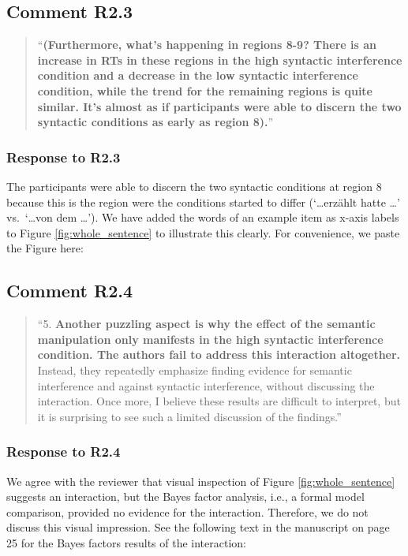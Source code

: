 \documentclass[12pt]{article}
\begin{document}
\subsection*{Comment R2.3}
\begin{quote}
``\textbf{(Furthermore, what's happening in regions 8-9? There is an increase in RTs in these regions in the high syntactic interference condition and a decrease in the low syntactic interference condition, while the trend for the remaining regions is quite similar. It's almost as if participants were able to discern the two syntactic conditions as early as region 8).}''
\end{quote}

\subsubsection*{Response to R2.3}
The participants were able to discern the two syntactic conditions at region 8 because this is the region were the conditions started to differ (`\dots erzählt hatte \dots' vs.\ `\dots von dem \dots'). We have added the words of an example item as x-axis labels to Figure \ref{fig:whole_sentence} to illustrate this clearly. For convenience, we paste the Figure here:

\setcounter{figure}{2}


\newpage

\subsection*{Comment R2.4}
\begin{quote}
``5. \textbf{Another puzzling aspect is why the effect of the semantic manipulation only manifests in the high syntactic interference condition. The authors fail to address this interaction altogether.} Instead, they repeatedly emphasize finding evidence for semantic interference and against syntactic interference, without discussing the interaction. Once more, I believe these results are difficult to interpret, but it is surprising to see such a limited discussion of the findings.''
\end{quote}

\subsubsection*{Response to R2.4}
We agree with the reviewer that visual inspection of Figure \ref{fig:whole_sentence} suggests an interaction, but the Bayes factor analysis, i.e., a formal model comparison, provided no evidence for the interaction. Therefore, we do not discuss this visual impression. See the following text in the manuscript on page 25 for the Bayes factors results of the interaction:
\end{document}
